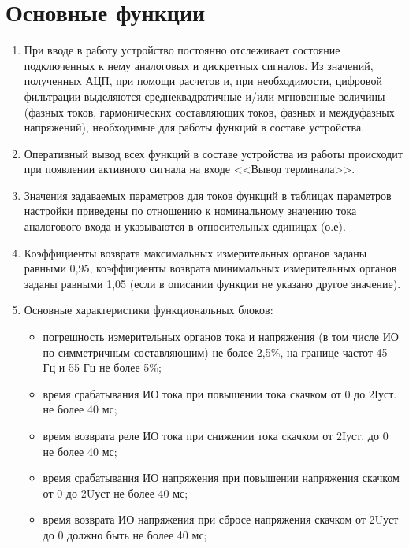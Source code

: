 \color{uniblue}\section[Основные функции]{Основные функции}\label{sec:funcs}
\color{black}

\color{black}

\begin{enumerate}
    
\item
При вводе в работу устройство постоянно отслеживает состояние подключенных к нему аналоговых и дискретных сигналов. Из значений, полученных АЦП, при помощи расчетов и, при необходимости, цифровой фильтрации выделяются среднеквадратичные и/или мгновенные величины (фазных токов, гармонических составляющих токов, фазных и междуфазных напряжений), необходимые для работы функций в составе устройства.
\item
Оперативный вывод всех функций в составе устройства из работы происходит при появлении активного сигнала на входе <<Вывод терминала>>.
\item
Значения задаваемых параметров для токов функций в таблицах параметров настройки приведены по отношению к номинальному значению тока аналогового входа и указываются в относительных единицах (о.е).
\item
Коэффициенты возврата максимальных измерительных органов заданы равными 0,95, коэффициенты возврата минимальных измерительных органов заданы равными 1,05 (если в описании функции не указано другое значение).
\item
Основные характеристики функциональных блоков:
\begin{itemize}
    \item погрешность измерительных органов тока и напряжения (в том числе ИО по симметричным составляющим) не более 2,5\%, на границе частот 45 Гц и 55 Гц не более 5\%;
    \item время срабатывания ИО тока при повышении тока скачком от 0 до 2Iуст. не более 40 мс;
    \item время возврата реле ИО тока при снижении тока скачком от 2Iуст. до 0 не более 40 мс;
    \item время срабатывания ИО напряжения при повышении напряжения скачком от 0 до 2Uуст не более 40 мс;
    \item время возврата ИО напряжения при сбросе напряжения скачком от 2Uуст до 0 должно быть не более 40 мс; 

\end{itemize}
\end{enumerate}
